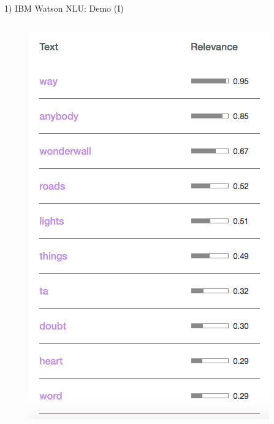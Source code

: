 \documentclass[xcolor=dvipsnames]{beamer}
\begin{document}
\begin{frame}{1) IBM Watson NLU: Demo (I)}
\begin{columns}
\begin{figure}
	\includegraphics[scale=0.25]{./images/keywords}
\end{figure}
\end{columns}
\end{frame}
\end{document}
